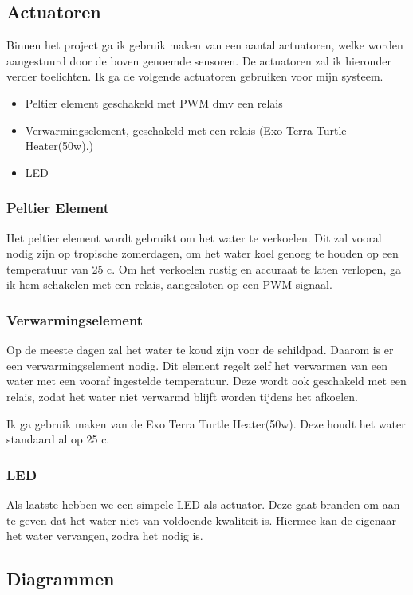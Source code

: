 \documentclass[a4paper]{report}
\begin{document}
\subsection{Actuatoren}
Binnen het project ga ik gebruik maken van een aantal actuatoren, welke worden aangestuurd door de boven genoemde sensoren.
De actuatoren zal ik hieronder verder toelichten. Ik ga de volgende actuatoren gebruiken voor mijn systeem.
\begin{itemize}
  \item Peltier element geschakeld met PWM dmv een relais
  \item Verwarmingselement, geschakeld met een relais (Exo Terra Turtle Heater(50w).)
  \item LED 
\end{itemize}

\subsubsection{Peltier Element}
Het peltier element wordt gebruikt om het water te verkoelen. 
Dit zal vooral nodig zijn op tropische zomerdagen, om het water koel genoeg te houden op een temperatuur van 25 \textdegree c.
Om het verkoelen rustig en accuraat te laten verlopen, ga ik hem schakelen met een relais, aangesloten op een PWM signaal.

\subsubsection{Verwarmingselement}
Op de meeste dagen zal het water te koud zijn voor de schildpad. Daarom is er een verwarmingselement nodig. 
Dit element regelt zelf het verwarmen van een water met een vooraf ingestelde temperatuur. 
Deze wordt ook geschakeld met een relais, zodat het water niet verwarmd blijft worden tijdens het afkoelen.

Ik ga gebruik maken van de Exo Terra Turtle Heater(50w).
Deze houdt het water standaard al op 25 \textdegree c. 

\subsubsection{LED}
Als laatste hebben we een simpele LED als actuator. Deze gaat branden om aan te geven dat het water niet van voldoende kwaliteit is.
Hiermee kan de eigenaar het water vervangen, zodra het nodig is. 

\subsection{Diagrammen}
\end{document}
